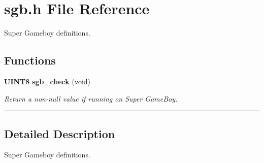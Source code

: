 \section{sgb.h File Reference}
\label{sgb.h}
Super Gameboy definitions. 


\subsection*{Functions}
\begin{CompactItemize}
\item 
\label{sgb.h_a0}
{\bf UINT8} {\bf sgb\_\-check} (void)
\begin{CompactList}\small\item\em Return a non-null value if running on Super Game\-Boy.\item\end{CompactList}

\end{CompactItemize}
\vspace{0.4cm}\hrule\vspace{0.2cm}
\subsection*{Detailed Description}
Super Gameboy definitions.